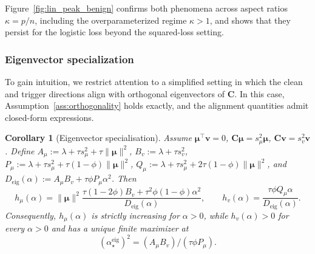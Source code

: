 \documentclass[11pt]{article}
\newcommand{\C}{\mathbf{C}}
\newcommand{\bv}{\mathbf{v}}
\newcommand{\bmu}{\boldsymbol{\mu}}
\newtheorem{corollary}[theorem]{Corollary}
\begin{document}
Figure~\ref{fig:lin_peak_benign} confirms both phenomena across aspect ratios
\(\kappa=p/n\), including the overparameterized regime \(\kappa>1\), and shows
that they persist for the logistic loss beyond the squared-loss
setting.


\subsubsection{Eigenvector specialization}
To gain intuition, we restrict attention to a simplified setting in which the clean and trigger directions align with orthogonal eigenvectors of \(\C\). In this case, Assumption~\ref{ass:orthogonality} holds exactly, and the alignment quantities admit closed-form expressions.
\begin{corollary}[Eigenvector specialisation]
\label{cor:lin_peak_eigen}
Assume  $\bmu^\top\bv=0$, $\C\bmu=s_\mu^2\bmu$, $\C\bv=s_v^2\bv$. Define $A_\mu:=\lambda+\tau s_\mu^2+\tau\|\bmu\|^2$, $B_v:=\lambda+\tau s_v^2$, $P_\mu:=\lambda+\tau s_\mu^2+\tau(1-\phi)\|\bmu\|^2$, $Q_\mu:=\lambda+\tau s_\mu^2+2\tau(1-\phi)\|\bmu\|^2$, and $D_{\mathrm{eig}}(\alpha):=A_\mu B_v+\tau\phi P_\mu\alpha^2$. Then
\begin{equation}
\label{eq:lin_ab_eigen_compact}
h_\mu(\alpha)
=
\|\bmu\|^2
\frac{\tau(1-2\phi)B_v+\tau^2\phi(1-\phi)\alpha^2}
{D_{\mathrm{eig}}(\alpha)},
\qquad
h_v(\alpha)
=
\frac{\tau\phi Q_\mu\alpha}
{D_{\mathrm{eig}}(\alpha)}.
\end{equation}
Consequently, \(h_\mu(\alpha)\) is strictly increasing for \(\alpha>0\),
while \(h_v(\alpha)>0\) for every \(\alpha>0\) and has a unique finite
maximizer at
\begin{equation}
\label{eq:lin_alpha_star_eigen_compact}
(\alpha_\star^{\mathrm{eig}})^2
=
(A_\mu B_v)/(\tau\phi P_\mu).
\end{equation}
\end{corollary}

\end{document}
